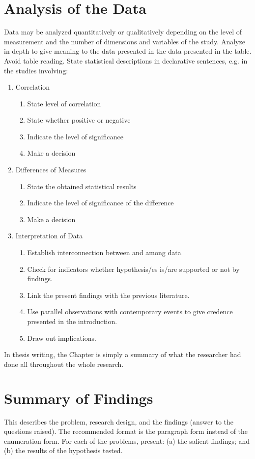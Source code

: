 \section{Analysis of the Data}
Data may be analyzed quantitatively or qualitatively depending on the level of measurement and the number of dimensions and variables of the study.
Analyze in depth to give meaning to the data presented in the data presented in the table. Avoid table reading.
State statistical descriptions in declarative sentences, e.g. in the studies involving:
\begin{enumerate}
	\item Correlation
	\begin{enumerate}
		\item State level of correlation
		\item State whether positive or negative
		\item Indicate the level of significance
		\item Make a decision
	\end{enumerate}
	\item Differences of Measures
	\begin{enumerate}
		\item State the obtained statistical results
		\item Indicate the level of significance of the difference
		\item Make a decision
	\end{enumerate}
	\item Interpretation of Data
	\begin{enumerate}
		\item Establish interconnection between and among data
		\item Check for indicators whether hypothesis/es is/are supported or not by findings.
		\item Link the present findings with the previous literature.
		\item Use parallel observations with contemporary events to give credence presented in the introduction.
		\item Draw out implications.
	\end{enumerate}
\end{enumerate}

In thesis writing, the Chapter is simply a summary of what the researcher had done all throughout the whole research. 
\section{Summary of Findings}
This describes the problem, research design, and the findings (answer to the questions raised). The recommended format is the paragraph form instead of the enumeration form. For each of the problems, present: (a) the salient findings; and (b) the results of the hypothesis tested.
